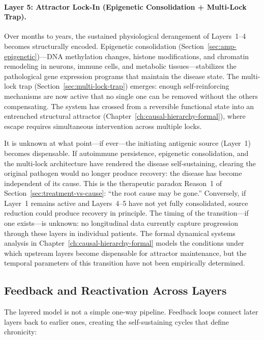 \paragraph{Layer 5: Attractor Lock-In (Epigenetic Consolidation + Multi-Lock Trap).} Over months to years, the sustained physiological derangement of Layers~1--4 becomes structurally encoded. Epigenetic consolidation (Section~\ref{sec:amp-epigenetic})---DNA methylation changes, histone modifications, and chromatin remodeling in neurons, immune cells, and metabolic tissues---stabilizes the pathological gene expression programs that maintain the disease state. The multi-lock trap (Section~\ref{sec:multi-lock-trap}) emerges: enough self-reinforcing mechanisms are now active that no single one can be removed without the others compensating. The system has crossed from a reversible functional state into an entrenched structural attractor (Chapter~\ref{ch:causal-hierarchy-formal}), where escape requires simultaneous intervention across multiple locks.

It is unknown at what point---if ever---the initiating antigenic source (Layer~1) becomes dispensable. If autoimmune persistence, epigenetic consolidation, and the multi-lock architecture have rendered the disease self-sustaining, clearing the original pathogen would no longer produce recovery: the disease has become independent of its cause. This is the therapeutic paradox Reason~1 of Section~\ref{sec:treatment-vs-cause}: ``the root cause may be gone.'' Conversely, if Layer~1 remains active and Layers~4--5 have not yet fully consolidated, source reduction could produce recovery in principle. The timing of the transition---if one exists---is unknown: no longitudinal data currently capture progression through these layers in individual patients. The formal dynamical systems analysis in Chapter~\ref{ch:causal-hierarchy-formal} models the conditions under which upstream layers become dispensable for attractor maintenance, but the temporal parameters of this transition have not been empirically determined.

\subsection{Feedback and Reactivation Across Layers}

The layered model is not a simple one-way pipeline. Feedback loops connect later layers back to earlier ones, creating the self-sustaining cycles that define chronicity:

